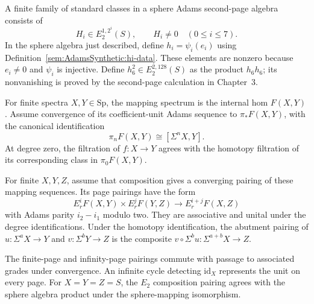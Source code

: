 \begin{definition}
\label{sem:AdamsSynthetic:standard-classes}
A finite family of standard classes in a sphere Adams second-page
algebra consists of
\[
H_i\in E_2^{1,2^i}(S),\qquad H_i\ne0\quad(0\leq i\leq7).
\]
In the sphere algebra just described, define $h_i=\psi_i(e_i)$ using Definition~\ref{sem:AdamsSynthetic:hi-data}.
These elements are nonzero because $e_i\ne0$ and $\psi_i$ is injective.
Define $h_6^2\in E_2^{2,128}(S)$ as the product $h_6h_6$;
its nonvanishing is proved by the second-page calculation in Chapter~3.
\end{definition}

\begin{definition}
\label{sem:AdamsSynthetic:mapping-composition}
For finite spectra $X,Y\in\mathrm{Sp}$, the mapping spectrum is the
internal hom $F(X,Y)$. Assume convergence of its coefficient-unit Adams
sequence to $\pi_*F(X,Y)$, with the canonical identification
\[
 \pi_nF(X,Y)\cong[\Sigma^nX,Y].
\]
At degree zero, the filtration of $f:X\to Y$ agrees with the homotopy
filtration of its corresponding class in $\pi_0F(X,Y)$.

For finite $X,Y,Z$, assume that composition gives a converging pairing
of these mapping sequences. Its page pairings have the form
\[
 E_r^iF(X,Y)\times E_r^jF(Y,Z)\longrightarrow E_r^{i+j}F(X,Z)
\]
with Adams parity $i_2-i_1$ modulo two. They are associative and unital
under the degree identifications. Under the homotopy identification,
the abutment pairing of $u:\Sigma^aX\to Y$ and
$v:\Sigma^bY\to Z$ is the composite
$v\circ\Sigma^bu:\Sigma^{a+b}X\to Z$.

The finite-page and infinity-page pairings commute with passage to
associated grades under convergence. An infinite cycle detecting
$\mathrm{id}_X$ represents the unit on every page. For $X=Y=Z=S$, the
$E_2$ composition pairing agrees with the sphere algebra product under
the sphere-mapping isomorphism.
\end{definition}

